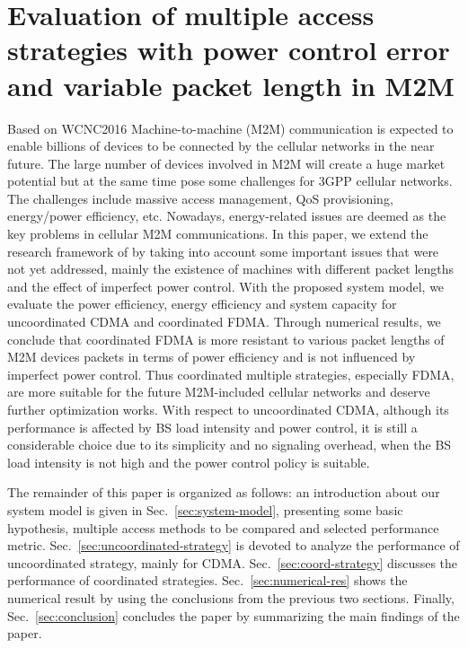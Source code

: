 \chapter{Evaluation of multiple access strategies with power control error 
and variable packet length in M2M}

\ifpdf
    \graphicspath{{Chapter3/Figs/Raster/}{Chapter3/Figs/PDF/}{Chapter3/Figs/}}
\else
    \graphicspath{{Chapter3/Figs/Vector/}{Chapter3/Figs/}}
\fi

Based on WCNC2016
Machine-to-machine (M2M) communication is expected to enable billions of devices to be connected by the cellular networks in the near future. The large number of devices involved in M2M will create a huge market potential but at the same time pose some challenges for 3GPP cellular networks. The challenges include massive access management, QoS provisioning, energy/power efficiency, etc. Nowadays, energy-related issues are deemed as the key problems in cellular M2M communications. In this paper, we extend the research framework of \cite{Dhi13} by taking into account some important issues that were not yet addressed, mainly the existence of machines with different packet lengths and the effect of imperfect power control. With the proposed system model, we evaluate the power efficiency, energy efficiency and system capacity for uncoordinated CDMA and coordinated FDMA. Through numerical results, we conclude that coordinated FDMA is more resistant to various packet lengths of M2M devices packets in terms of power efficiency and is not influenced by imperfect power control. Thus coordinated multiple strategies, especially FDMA, are more suitable for the future M2M-included cellular networks and deserve further optimization works. With respect to uncoordinated CDMA, although its performance is affected by BS load intensity and power control, it is still a considerable choice due to its simplicity and no signaling overhead, when the BS load intensity is not high and the power control policy is suitable. 

The remainder of this paper is organized as follows: an introduction about our system model is given in Sec.~\ref{sec:system-model}, presenting some basic hypothesis, multiple access methods to be compared and selected performance metric.  
Sec.~\ref{sec:uncoordinated-strategy} is devoted to analyze the performance of uncoordinated strategy, mainly for CDMA. 
Sec.~\ref{sec:coord-strategy} discusses the performance of coordinated strategies. 
Sec.~\ref{sec:numerical-res} shows the numerical result by using the conclusions from the previous two sections.
Finally, Sec.~\ref{sec:conclusion} concludes the paper by summarizing the main findings of the paper.











